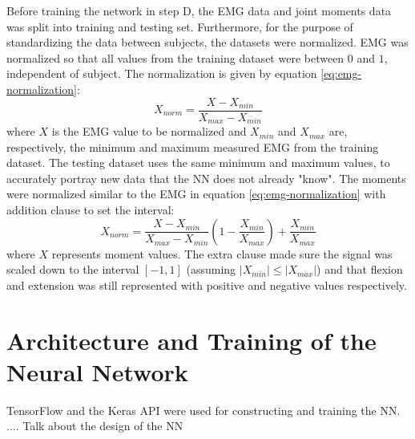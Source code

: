 \documentclass[../main.tex]{subfiles}
\begin{document}
Before training the network in step D, the \ac{EMG} data and joint moments data was split into training and testing set.
Furthermore, for the purpose of standardizing the data between subjects, the datasets were normalized.
\ac{EMG} was normalized so that all values from the training dataset were between $0$ and $1$, independent of subject.
The normalization is given by equation \ref{eq:emg-normalization}:
\begin{equation}
\label{eq:emg-normalization}
    X_{norm} = \frac{X - X_{min}}{X_{max} - X_{min}}
\end{equation}
where $X$ is the \ac{EMG} value to be normalized and $X_{min}$ and $X_{max}$ are, respectively, the minimum and maximum measured \ac{EMG} from the training dataset. 
The testing dataset uses the same minimum and maximum values, to accurately portray new data that the \ac{NN} does not already "know".
The moments were normalized similar to the \ac{EMG} in equation \ref{eq:emg-normalization} with addition clause to set the interval:
\begin{equation}
\label{eq:moment-normalization}
    X_{norm} = \frac{X - X_{min}}{X_{max} - X_{min}}\left(1 - \frac{X_{min}}{X_{max}}\right) + \frac{X_{min}}{X_{max}}
\end{equation}
where $X$ represents moment values. 
The extra clause made sure the signal was scaled down to the interval $[-1,1]$ (assuming $\left|X_{min}\right| \leq \left|X_{max}\right|$) and that flexion and extension was still represented with positive and negative values respectively.

\section{Architecture and Training of the Neural Network}
TensorFlow \cite{tensorflow2015-whitepaper} and the Keras API \cite{chollet2015keras} were used for constructing and training the \ac{NN}.
.... Talk about the design of the \ac{NN}


\end{document}
